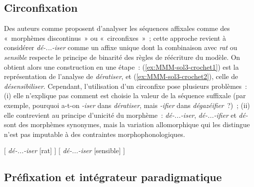 \documentclass[output=paper]{langsci/langscibook}
\begin{document}
\subsection{Circonfixation}
\label{sec:MMM-sol3}

Des auteurs comme \citet{bosque1983.morfologia} proposent d'analyser les séquences affixales comme des «~morphèmes discontinus~» ou «~circonfixes~»~; cette approche revient à considérer \emph{\mbox{dé-...-iser}} comme un affixe unique dont la combinaison avec \emph{rat} ou \emph{sensible} respecte le principe de binarité des règles de réécriture du modèle. On obtient alors une construction en une étape~: (\ref{ex:MMM-sol3-crochet1}) est la représentation de l'analyse de \emph{dératiser}, et (\ref{ex:MMM-sol3-crochet2}), celle de \emph{désensibiliser}.  Cependant, l'utilisation d'un circonfixe pose plusieurs problèmes~: (i) elle n'explique pas comment est choisie la valeur de la séquence suffixale (par exemple, pourquoi a-t-on \emph{\mbox{-iser}} dans \emph{dératiser}, mais \emph{\mbox{-ifier}} dans \emph{dégazéifier}~?)~; (ii) elle contrevient au principe d'unicité du morphème~: \emph{\mbox{dé-...-iser}}, \emph{\mbox{dé-...-ifier}} et \emph{\mbox{dé-}} sont des morphèmes synonymes, mais la variation allomorphique qui les distingue n'est pas imputable à des contraintes morphophonologiques.

\begin{exe}
\ex\label{ex:MMM-sol3-crochet1} [ \emph{\mbox{dé-...-iser}} [rat] ]
\ex\label{ex:MMM-sol3-crochet2} [ \emph{\mbox{dé-...-iser}} [sensible] ]
\end{exe}

\subsection{Préfixation et intégrateur paradigmatique}
\label{sec:MMM-sol4}
\end{document}
